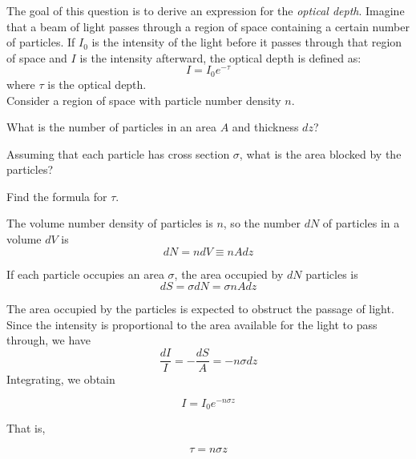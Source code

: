 \documentclass[11pt]{article}
\begin{document}
\begin{pproblem}
    The goal of this question is to derive an expression for the \textit{optical depth}. Imagine that a beam of light passes through a region of space containing a certain number of particles. If \(I_0\) is the intensity of the light before it passes through that region of space and \(I\) is the intensity afterward, the optical depth is defined as:
    \[I = I_0e^{-\tau}\]
    where \(\tau\) is the optical depth.
    \\
    Consider a region of space with particle number density \(n\).
    \begin{alternativas}
        \item What is the number of particles in an area \(A\) and thickness \(dz\)?
        \item Assuming that each particle has cross section \(\sigma\), what is the area blocked by the particles?
        \item Find the formula for \(\tau\). 
    \end{alternativas}

\begin{pssolution*}{}{}
    \begin{alternativas}
        \item The volume number density of particles is \(n\), so the number \(dN\) of particles in a volume \(dV\) is
        \[\boxed{dN = ndV \equiv nAdz}\]

        \item If each particle occupies an area \(\sigma\), the area occupied by \(dN\) particles is
        \[\boxed{dS = \sigma dN = \sigma nAdz}\]

        \item The area occupied by the particles is expected to obstruct the passage of light. Since the intensity is proportional to the area available for the light to pass through, we have
        \[\frac{dI}{I} = -\frac{dS}{A} = -n\sigma dz\]
        Integrating, we obtain

        \[I = I_0 e^{-n\sigma z}\]

        That is,

        \[\boxed{\tau = n\sigma z}\]
    \end{alternativas}
\end{pssolution*}
\end{pproblem}
\end{document}
